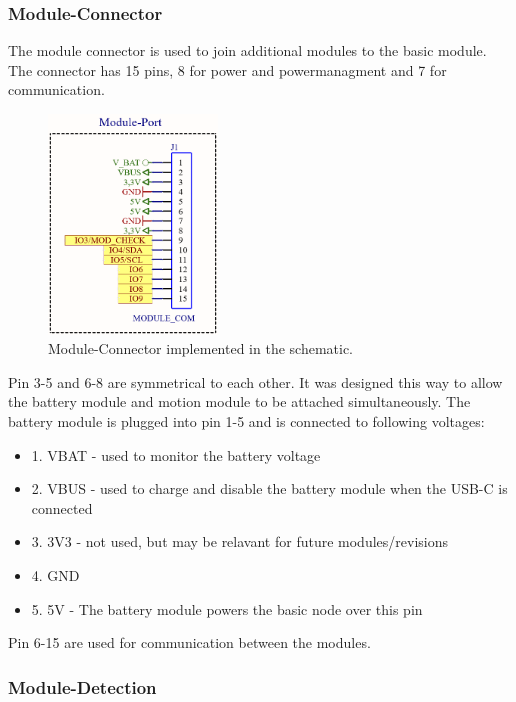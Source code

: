     \subsubsection{Module-Connector}

    The module connector is used to join additional modules to the basic module.
    The connector has 15 pins, 8 for power and powermanagment and 7 for 
    communication. 

    \begin{figure}[H]
        \centering
        \includegraphics[width=0.4\textwidth]{assets/HW/Node-Module-Connector.png}
        \caption{Module-Connector implemented in the schematic.}
    \end{figure}

    Pin 3-5 and 6-8 are symmetrical to each other. It was designed this way
    to allow the battery module and motion module to be attached simultaneously.
    The battery module is plugged into pin 1-5 and is connected to following 
    voltages:
    
    \begin{itemize}
        \item 1. VBAT - used to monitor the battery voltage
        \item 2. VBUS - used to charge and disable the battery module when the USB-C 
        is connected
        \item 3. 3V3 - not used, but may be relavant for future modules/revisions
        \item 4. GND
        \item 5. 5V - The battery module powers the basic node over this pin
    \end{itemize}

    Pin 6-15 are used for communication between the modules. 


    \subsubsection{Module-Detection}
    
